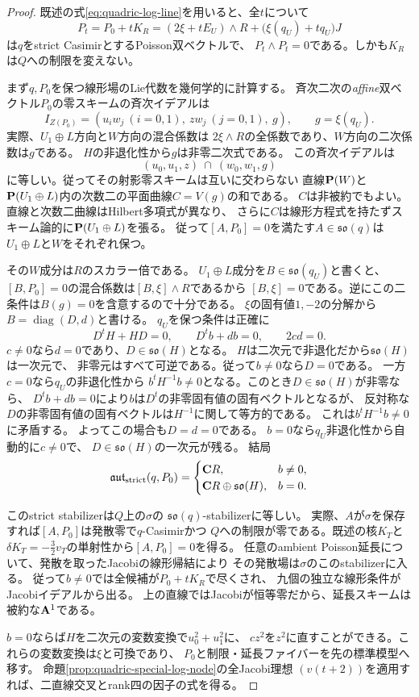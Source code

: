 \begin{proof}
既述の式\eqref{eq:quadric-log-line}を用いると、全$t$について
\[
 P_t=P_0+tK_R=(2\xi+tE_U)\wedge R+
                  \bigl(\xi(q_U)+tq_U\bigr)J
\]
は$q$をstrict CasimirとするPoisson双ベクトルで、
$P_t\wedge P_t=0$である。しかも$K_R$は$Q$への制限を変えない。

まず$q,P_0$を保つ線形場のLie代数を幾何学的に計算する。
斉次二次の\emph{affine}双ベクトル$P_0$の零スキームの斉次イデアルは
\[
 I_{Z(P_0)}=(u_iw_j\ (i=0,1),\ zw_j\ (j=0,1),\ g),
 \qquad g=\xi(q_U).
\]
実際、$U_1\oplus L$方向と$W$方向の混合係数は
$2\xi\wedge R$の全係数であり、$W$方向の二次係数は$g$である。
$H$の非退化性から$g$は非零二次式である。
この斉次イデアルは
\[
 (u_0,u_1,z)\ \cap\ (w_0,w_1,g)
\]
に等しい。従ってその射影零スキームは互いに交わらない
直線$\PP(W)$と$\PP(U_1\oplus L)$内の次数二の平面曲線$C=V(g)$の和である。
$C$は非被約でもよい。直線と次数二曲線はHilbert多項式が異なり、
さらに$C$は線形方程式を持たずスキーム論的に$\PP(U_1\oplus L)$を張る。
従って$[A,P_0]=0$を満たす$A\in\mathfrak{so}(q)$は
$U_1\oplus L$と$W$をそれぞれ保つ。

その$W$成分は$R$のスカラー倍である。
$U_1\oplus L$成分を$B\in\mathfrak{so}(q_U)$と書くと、
$[B,P_0]=0$の混合係数は$[B,\xi]\wedge R$であるから
$[B,\xi]=0$である。逆にこの二条件は$B(g)=0$を含意するので十分である。
$\xi$の固有値$1,-2$の分解から
$B=\operatorname{diag}(D,d)$と書ける。
$q_U$を保つ条件は正確に
\[
 D^tH+HD=0,\qquad D^tb+db=0,\qquad 2cd=0.
\]
$c\ne0$なら$d=0$であり、$D\in\mathfrak{so}(H)$となる。
$H$は二次元で非退化だから$\mathfrak{so}(H)$は一次元で、
非零元はすべて可逆である。従って$b\ne0$なら$D=0$である。
一方$c=0$なら$q_U$の非退化性から
$b^tH^{-1}b\ne0$となる。このとき$D\in\mathfrak{so}(H)$が非零なら、
$D^tb+db=0$により$b$は$D^t$の非零固有値の固有ベクトルとなるが、
反対称な$D$の非零固有値の固有ベクトルは$H^{-1}$に関して等方的である。
これは$b^tH^{-1}b\ne0$に矛盾する。
よってこの場合も$D=d=0$である。
$b=0$なら$q_U$非退化性から自動的に$c\ne0$で、
$D\in\mathfrak{so}(H)$の一次元が残る。
結局
\[
 \mathfrak{aut}_{\mathrm{strict}}(q,P_0)
 =\begin{cases}\CC R,&b\ne0,\\
  \CC R\oplus\mathfrak{so}(H),&b=0.
 \end{cases}
\]

このstrict stabilizerは$Q$上の$\sigma$の
$\mathfrak{so}(q)$-stabilizerに等しい。
実際、$A$が$\sigma$を保存すれば$[A,P_0]$は発散零で$q$-Casimirかつ
$Q$への制限が零である。既述の核$K_T$と
$\delta K_T=-\frac32v_T$の単射性から$[A,P_0]=0$を得る。
任意のambient Poisson延長について、発散を取ったJacobiの線形帰結により
その発散場は$\sigma$のこのstabilizerに入る。
従って$b\ne0$では全候補が$P_0+tK_R$で尽くされ、
九個の独立な線形条件がJacobiイデアルから出る。
上の直線ではJacobiが恒等零だから、延長スキームは被約な$\AA^1$である。

$b=0$ならば$H$を二次元の変数変換で$u_0^2+u_1^2$に、
$cz^2$を$z^2$に直すことができる。これらの変数変換は$\xi$と可換であり、
$P_0$と制限・延長ファイバーを先の標準模型へ移す。
命題\ref{prop:quadric-special-log-node}の全Jacobi理想
$(v(t+2))$を適用すれば、二直線交叉とrank四の因子の式を得る。
\end{proof}

